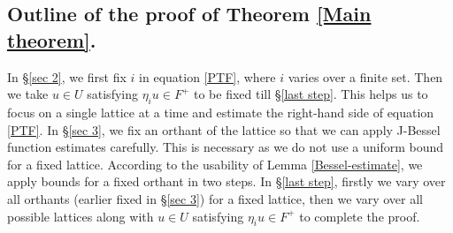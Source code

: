 \documentclass[reqno]{amsart}
\theoremstyle{plain}
\theoremstyle{definition}
\theoremstyle{remark}
\begin{document}
\subsection*{Outline of the proof of Theorem \ref{Main theorem}.}
In  \S\ref{sec 2}, we first fix $i$ in equation \eqref{PTF}, where $i$ varies over a finite set. Then we take $u\in U$ satisfying $\eta_i u\in F^+$ to be fixed till \S\ref{last step}.  This helps us to focus on a single lattice at a time and estimate the right-hand side of equation \eqref{PTF}. In \S \ref{sec 3}, we fix an orthant of the lattice so that we can apply J-Bessel function estimates carefully. This is necessary as we do not use a uniform bound for a fixed lattice.  According to the usability of Lemma \ref{Bessel-estimate}, we apply bounds for a fixed orthant in two steps.  
In \S \ref{last step}, firstly we vary over all orthants (earlier fixed in \S \ref{sec 3})  for a fixed lattice, then we vary over all possible lattices along with  $u\in U$ satisfying $\eta_i u\in F^+$ to complete the proof. 
\end{document}

